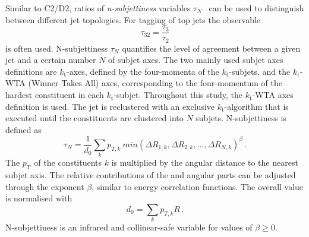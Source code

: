 Similar to C2/D2, ratios of \textit{n-subjettiness} variables $\tau_N$~\cite{bib:nsub} can be used to distinguish between different jet topologies. For tagging of top jets the observable
\begin{equation*}
\tau_{32} = \frac{\tau_3}{\tau_2}  
\end{equation*} 
is often used. N-subjettiness $\tau_N$ quantifies the level of agreement between a given \larger jet and a certain number $N$ of subjet axes. The two mainly used subjet axes definitions are $k_\mathrm{t}$-axes, defined by the four-momenta of the $k_\mathrm{t}$-subjets, and the $k_\mathrm{t}$-WTA (Winner Takes All) axes,  corresponding to the four-momentum of the hardest constituent in each $k_\mathrm{t}$-subjet. Throughout this study, the $k_\mathrm{t}$-WTA axes definition is used. The jet is reclustered with an exclusive $k_\mathrm{t}$-algorithm that is executed until the constituents are clustered into $N$ subjets. N-subjettiness is defined as
\begin{equation}
\tau_N = \frac{1}{d_0}\sum_k p_{T,k}\:min(\Delta R_{1,k},\Delta R_{2,k},...,\Delta R_{N,k})^{\beta}\,.
\label{eq:taun}
\end{equation}
The $p_{\mathrm{T}}$ of the constituents $k$ is multiplied by the angular distance to the nearest subjet axis. The relative contributions of the \pt and angular parts can be adjusted through the exponent $\beta$, similar to energy correlation functions. The overall value is normalised with 
\begin{equation*}
d_0=\sum_k p_{T,k}R\,.
\end{equation*}
N-subjettiness is an infrared and collinear-safe variable for values of $\beta \ge 0$.

